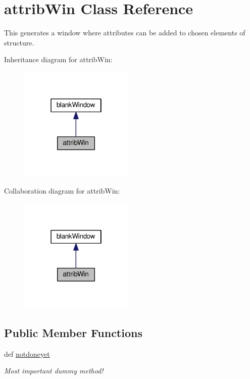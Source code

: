 \hypertarget{classgui_1_1window2_1_1attribWin}{\section{attrib\-Win Class Reference}
\label{classgui_1_1window2_1_1attribWin}
}


This generates a window where attributes can be added to chosen elements of structure.  




Inheritance diagram for attrib\-Win\-:\nopagebreak
\begin{figure}[H]
\begin{center}
\leavevmode
\includegraphics[width=154pt]{classgui_1_1window2_1_1attribWin__inherit__graph}
\end{center}
\end{figure}


Collaboration diagram for attrib\-Win\-:\nopagebreak
\begin{figure}[H]
\begin{center}
\leavevmode
\includegraphics[width=154pt]{classgui_1_1window2_1_1attribWin__coll__graph}
\end{center}
\end{figure}
\subsection*{Public Member Functions}
\begin{DoxyCompactItemize}
\item 
\hypertarget{classgui_1_1window2_1_1attribWin_a615f3073891733337c33f599f89ec7ef}{def \hyperlink{classgui_1_1window2_1_1attribWin_a615f3073891733337c33f599f89ec7ef}{notdoneyet}}\label{classgui_1_1window2_1_1attribWin_a615f3073891733337c33f599f89ec7ef}

\begin{DoxyCompactList}\small\item\em Most important dummy method! \end{DoxyCompactList}\end{DoxyCompactItemize}


